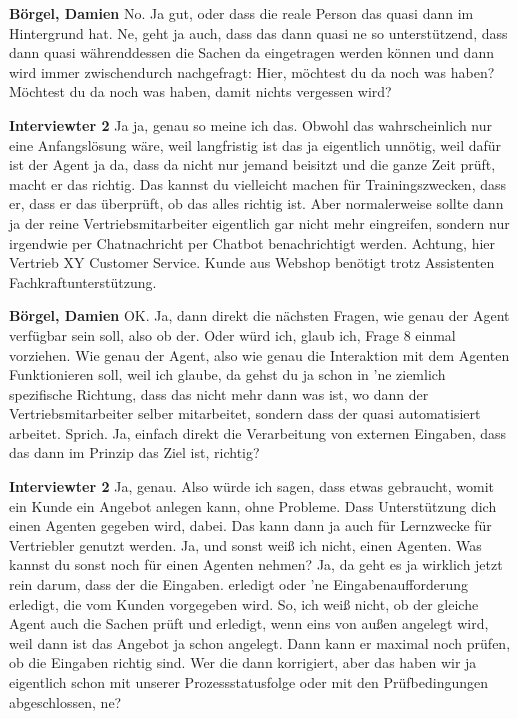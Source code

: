 \textbf{Börgel, Damien}\newline
No.
Ja gut, oder dass die reale Person das quasi dann im Hintergrund hat. Ne, geht ja auch, dass das dann quasi ne so unterstützend, dass dann quasi währenddessen die Sachen da eingetragen werden können und dann wird immer zwischendurch nachgefragt: \glqq{}Hier, möchtest du da noch was haben? Möchtest du da noch was haben, damit nichts vergessen wird?\grqq{}

\textbf{Interviewter 2}\newline
Ja ja, genau so meine ich das. Obwohl das wahrscheinlich nur eine Anfangslösung wäre, weil langfristig ist das ja eigentlich unnötig, weil dafür ist der Agent ja da, dass da nicht nur jemand beisitzt und die ganze Zeit prüft, macht er das richtig. Das kannst du vielleicht machen für Trainingszwecken, dass er, dass er das überprüft, ob das alles richtig ist. Aber normalerweise sollte dann ja der reine Vertriebsmitarbeiter eigentlich gar nicht mehr eingreifen, sondern nur irgendwie per Chatnachricht per Chatbot benachrichtigt werden. Achtung, hier Vertrieb XY Customer Service.
Kunde aus Webshop benötigt trotz Assistenten Fachkraftunterstützung. 

\textbf{Börgel, Damien}\newline
OK. 
Ja, dann direkt die nächsten Fragen, wie genau der Agent verfügbar sein soll, also ob der.
Oder würd ich, glaub ich, Frage 8 einmal vorziehen. Wie genau der Agent, also wie genau die Interaktion mit dem Agenten Funktionieren soll, weil ich glaube, da gehst du ja schon in 'ne ziemlich spezifische Richtung, dass das nicht mehr dann was ist, wo dann der Vertriebsmitarbeiter selber mitarbeitet, sondern dass der quasi automatisiert arbeitet.
Sprich.
Ja, einfach direkt die Verarbeitung von externen Eingaben, dass das dann im Prinzip das Ziel ist, richtig?

\textbf{Interviewter 2}\newline
Ja, genau. Also würde ich sagen, dass etwas gebraucht, womit ein Kunde ein Angebot anlegen kann, ohne Probleme. Dass Unterstützung dich einen Agenten gegeben wird, dabei. Das kann dann ja auch für Lernzwecke für Vertriebler genutzt werden.
Ja, und sonst weiß ich nicht, einen Agenten. Was kannst du sonst noch für einen Agenten nehmen?
Ja, da geht es ja wirklich jetzt rein darum, dass der die Eingaben.
erledigt oder 'ne Eingabenaufforderung erledigt, die vom Kunden vorgegeben wird. So, ich weiß nicht, ob der gleiche Agent auch die Sachen prüft und erledigt, wenn eins von außen angelegt wird, weil dann ist das Angebot ja schon angelegt.
Dann kann er maximal noch prüfen, ob die Eingaben richtig sind.
Wer die dann korrigiert, aber das haben wir ja eigentlich schon mit unserer Prozessstatusfolge oder mit den Prüfbedingungen abgeschlossen, ne?

